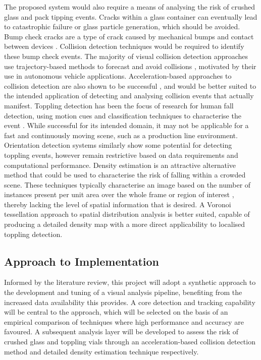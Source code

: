 \documentclass[10pt]{article}
\begin{document}
The proposed system would also require a means of analysing the risk of crushed glass and pack tipping events. Cracks within a glass container can eventually lead to catastrophic failure or glass particle generation, which should be avoided. Bump check cracks are a type of crack caused by mechanical bumps and contact between devices \cite{schaut2017enhancing}. Collision detection techniques would be required to identify these bump check events. The majority of visual collision detection approaches use trajectory-based methods to forecast and avoid collisions \cite{veeraraghavan2003computer}\cite{lai2011airborne}, motivated by their use in autonomous vehicle applications. Acceleration-based approaches to collision detection are also shown to be successful \cite{speleers2019acceleration}, and would be better suited to the intended application of detecting and analysing collision events that actually manifest. Toppling detection has been the focus of research for human fall detection, using motion cues and classification techniques to characterise the event \cite{rougier2007fall}. While successful for its intended domain, it may not be applicable for a fast and continuously moving scene, such as a production line environment. Orientation detection systems \cite{pavlakos20176} similarly show some potential for detecting toppling events, however remain restrictive based on data requirements and computational performance. Density estimation is an attractive alternative method that could be used to characterise the risk of falling within a crowded scene. These techniques typically characterise an image based on the number of instances present per unit area over the whole frame or region of interest \cite{velastin1994automated}\cite{abbas2013real}, thereby lacking the level of spatial information that is desired. A Voronoi tessellation approach to spatial distribution analysis \cite{duyckaerts2000voronoi} is better suited, capable of producing a detailed density map with a more direct applicability to localised toppling detection.

\subsection{Approach to Implementation}
Informed by the literature review, this project will adopt a synthetic approach to the development and tuning of a visual analysis pipeline, benefiting from the increased data availability this provides. A core detection and tracking capability will be central to the approach, which will be selected on the basis of an empirical comparison of techniques where high performance and accuracy are favoured. A subsequent analysis layer will be developed to assess the risk of crushed glass and toppling vials through an acceleration-based collision detection method and detailed density estimation technique respectively. 
\clearpage
\end{document}
